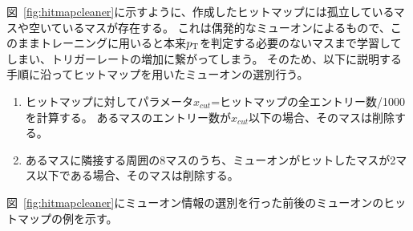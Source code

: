 図~\ref{fig:hitmapcleaner}に示すように、作成したヒットマップには孤立しているマスや空いているマスが存在する。
これは偶発的なミューオンによるもので、このままトレーニングに用いると本来$p_{\rm{T}}$を判定する必要のないマスまで学習してしまい、トリガーレートの増加に繋がってしまう。
そのため、以下に説明する手順に沿ってヒットマップを用いたミューオンの選別行う。
\begin{enumerate}
   \item ヒットマップに対してパラメータ$x_{cut}$=ヒットマップの全エントリー数/1000を計算する。
         あるマスのエントリー数が$x_{cut}$以下の場合、そのマスは削除する。
   \item あるマスに隣接する周囲の8マスのうち、ミューオンがヒットしたマスが2マス以下である場合、そのマスは削除する。
\end{enumerate}
図~\ref{fig:hitmapcleaner}にミューオン情報の選別を行った前後のミューオンのヒットマップの例を示す。
